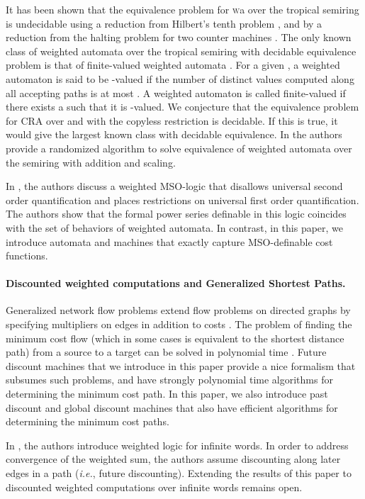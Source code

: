 \documentclass[11pt]{article}
\newcommand{\EDWA}{{CRA}\xspace}
\newcommand{\WA}{{\sc\textsc wa}\xspace}
\newcommand{\ie}{{\em i.e.}\xspace}
\begin{document}
It has been shown that the equivalence problem for \WA over the tropical
semiring is undecidable using a reduction from Hilbert's tenth problem
\cite{krob_equality_1992}, and by a reduction from the halting problem for
two counter machines \cite{almagor_what_2011}. The only known class of
weighted automata over the tropical semiring with decidable equivalence problem is that of
finite-valued weighted automata \cite{weber_finite_1994}. For a given ,
a weighted automaton is said to be -valued if the number of distinct
values computed along all accepting paths is at most . A weighted
automaton is called finite-valued if there exists a  such that it is
-valued.  We conjecture that the equivalence problem for \EDWA over
 and  with the copyless restriction is decidable. If this is
true, it would give the largest known class with decidable equivalence.
In \cite{Kiefer} the authors provide a randomized algorithm
to solve equivalence of weighted automata over the semiring with addition and
scaling.

In \cite{droste_weighted_2005}, the authors discuss a weighted
MSO-logic that disallows universal second order quantification and
places restrictions on universal first order quantification. The
authors show that the formal power series definable in this logic
coincides with the set of behaviors of weighted automata. In contrast,
in this paper, we introduce automata and machines that exactly capture
MSO-definable cost functions.

\paragraph{Discounted weighted computations and Generalized Shortest Paths.}
Generalized network flow problems extend flow problems on directed
graphs by specifying multipliers on edges in addition to costs
\cite{goldberg_combinatorial_1988, oldham_combinatorial_1999}.  The
problem of finding the minimum cost flow (which in some cases is
equivalent to the shortest distance path) from a source to a target
can be solved in polynomial time \cite{oldham_combinatorial_1999,
batagelj_generalized_2000}.  Future discount machines that we
introduce in this paper provide a nice formalism that subsumes such
problems, and have strongly polynomial time algorithms for determining
the minimum cost path.  In this paper, we also introduce past discount
and global discount machines that also have efficient algorithms for
determining the minimum cost paths.

In \cite{droste_weighted_2009}, the authors introduce weighted logic
for infinite words. In order to address convergence of the weighted
sum, the authors assume discounting along later edges in a path (\ie,
future discounting). Extending the results of this paper to discounted
weighted computations over infinite words remains open.
\end{document}
